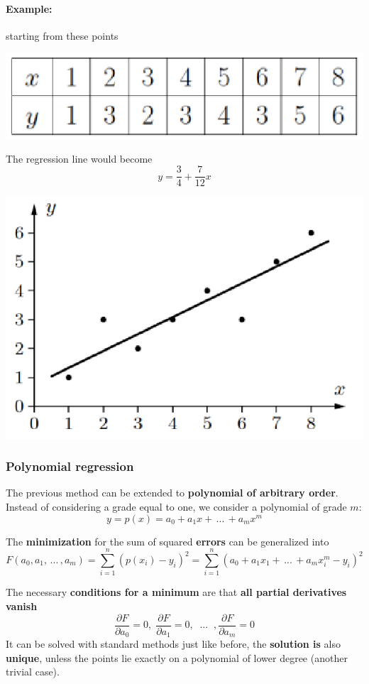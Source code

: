 \paragraph{Example:} starting from these points
\begin{center}
	\includegraphics[width=0.45\columnwidth]{img/NN/linreg1}
\end{center}
The regression line would become
$$ y = \frac{3}{4} + \frac{7}{12} x $$
\begin{center}
	\includegraphics[width=0.5\columnwidth]{img/NN/linreg2}
\end{center}

\newpage

\subsubsection{Polynomial regression}
The previous method can be extended to \textbf{polynomial of arbitrary order}. Instead of considering a grade equal to one, we consider a polynomial of grade $m$: 
$$ y = p(x) = a_0 + a_1 x + \, ... \, + a_m x^m $$

The \textbf{minimization} for the sum of squared \textbf{errors} can be generalized into
$$ F(a_0, a_1, \, ... \, , a_m) = \sum_{i=1}^n \left(p(x_i) - y_i\right)^2 = \sum_{i=1}^n (a_0 + a_1 x_1 + \, ... \, + a_m x_i^m - y_i)^2 $$

The necessary \textbf{conditions for a minimum} are that \textbf{all partial derivatives vanish}
$$ \frac{\partial F}{\partial a_0} = 0, \; \frac{\partial F}{\partial a_1} = 0, \;\; ... \;\; , \frac{\partial F}{\partial a_m} = 0 $$
It can be solved with standard methods just like before, the \textbf{solution is} also \textbf{unique}, unless the points lie exactly on a polynomial of lower degree (another trivial case).\\

\newpage

